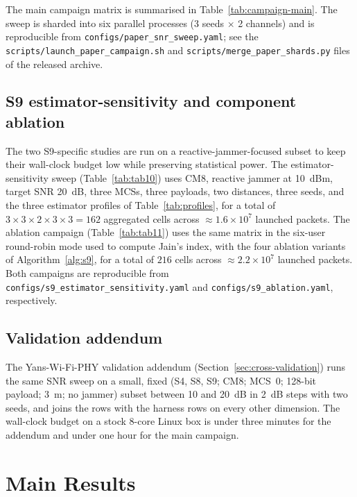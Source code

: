 \documentclass[journal,onecolumn,11pt,a4paper]{IEEEtran}
\begin{document}
The main campaign matrix is summarised in
Table~\ref{tab:campaign-main}. The sweep is sharded into six parallel
processes (3 seeds $\times$ 2 channels) and is reproducible from
\texttt{configs/paper\_snr\_sweep.yaml}; see the
\texttt{scripts/launch\_paper\_campaign.sh} and
\texttt{scripts/merge\_paper\_shards.py} files of the released
archive.

\subsection{S9 estimator-sensitivity and component ablation}
\label{sec:setup-tab}

The two S9-specific studies are run on a reactive-jammer-focused
subset to keep their wall-clock budget low while preserving statistical
power. The estimator-sensitivity sweep (Table~\ref{tab:tab10}) uses
CM8, reactive jammer at \SI{10}{dBm}, target SNR \SI{20}{dB}, three
MCSs, three payloads, two distances, three seeds, and the three
estimator profiles of Table~\ref{tab:profiles}, for a total of
$3{\times}3{\times}2{\times}3{\times}3 = 162$ aggregated cells across
$\approx 1.6\times 10^7$ launched packets. The ablation campaign
(Table~\ref{tab:tab11}) uses the same matrix in the six-user
round-robin mode used to compute Jain's index, with the four ablation
variants of Algorithm~\ref{alg:s9}, for a total of $216$ cells across
$\approx 2.2 \times 10^7$ launched packets. Both campaigns are
reproducible from \texttt{configs/s9\_estimator\_sensitivity.yaml}
and \texttt{configs/s9\_ablation.yaml}, respectively.

\subsection{Validation addendum}
\label{sec:setup-val}

The Yans-Wi-Fi-PHY validation addendum
(Section~\ref{sec:cross-validation}) runs the same SNR sweep on a
small, fixed (S4, S8, S9; CM8; MCS~0; 128-bit payload;
\SI{3}{m}; no jammer) subset between 10 and \SI{20}{dB} in
\SI{2}{dB} steps with two seeds, and joins the rows with the harness
rows on every other dimension. The wall-clock budget on a stock 8-core
Linux box is under three minutes for the addendum and under one hour
for the main campaign.

\section{Main Results}
\label{sec:results-main}
\end{document}
